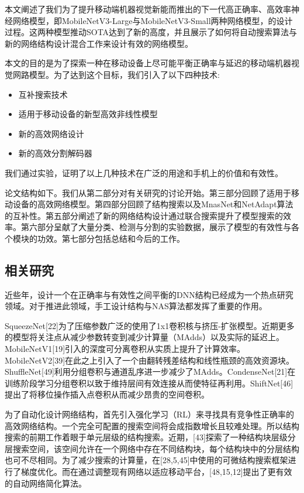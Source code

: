 本文阐述了我们为了提升移动端机器视觉新能而推出的下一代高正确率、高效率神经网络模型，即MobileNetV3-Large与MobileNetV3-Small两种网络模型，的设计过程。这两种模型推动SOTA达到了新的高度，并且展示了如何将自动搜索算法与新的网络结构设计混合工作来设计有效的网络模型。

本文的目的是为了探索一种在移动设备上尽可能平衡正确率与延迟的移动端机器视觉网路模型。为了达到这个目标，我们引入了以下四种技术:

\begin{itemize}
    \item 互补搜索技术
    \item 适用于移动设备的新型高效非线性模型
    \item 新的高效网络设计
    \item 新的高效分割解码器
  \end{itemize}

我们通过实验，证明了以上几种技术在广泛的用途和手机上的价值和有效性。

论文结构如下。我们从第二部分对有关研究的讨论开始。第三部分回顾了适用于移动设备的高效网络模型。第四部分回顾了结构搜索以及MnasNet和NetAdapt算法的互补性。第五部分阐述了新的网络结构设计通过联合搜索提升了模型搜索的效率。第六部分呈献了大量分类、检测与分割的实验数据，展示了模型的有效性与各个模块的功效。第七部分包括总结和今后的工作。

\subsection{相关研究}

近些年，设计一个在正确率与有效性之间平衡的DNN结构已经成为一个热点研究领域。对于推进此领域，手工设计结构与NAS算法都发挥了重要的作用。

SqueezeNet[22]为了压缩参数广泛的使用了1x1卷积核与挤压-扩张模型。近期更多的模型将关注点从减少参数转变到减少计算量（MAdds）以及实际的延迟上。MobileNetV1[19]引入的深度可分离卷积从实质上提升了计算效率。MobileNetV2[39]在此之上引入了一个由翻转残差结构和线性瓶颈的高效资源块。ShuffleNet[49]利用分组卷积与通道乱序进一步减少了MAdds。CondenseNet[21]在训练阶段学习分组卷积以致于维持层间有效连接从而使特征再利用。ShiftNet[46]提出了将移位操作插入点卷积从而减少昂贵的空间卷积。

为了自动化设计网络结构，首先引入强化学习（RL）来寻找具有竞争性正确率的高效网络结构。一个完全可配置的搜索空间将会成指数增长且较难处理。所以结构搜索的前期工作着眼于单元层级的结构搜索。近期，[43]探索了一种结构块层级分层搜索空间，该空间允许在一个网络中存在不同结构块，每个结构块中的分层结构也可不尽相同。为了减少搜索的计算量，在[28,5,45]中使用的可微结构搜索框架进行了梯度优化。而在通过调整现有网络以适应移动平台，[48,15,12]提出了更有效的自动网络简化算法。


